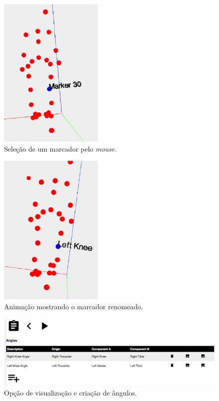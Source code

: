 \begin{figure}[ht]
	\centering
	\includegraphics[width=5cm]{figuras/tela20.eps}
	\caption{Seleção de um marcador pelo \emph{mouse}.}
\label{tela20}
\end{figure}



\begin{figure}[ht]
	\centering
	\includegraphics[width=5cm]{figuras/tela22.eps}
	\caption{Animação mostrando o marcador renomeado.}
\label{tela22}

\end{figure}


\begin{figure}[ht]
	\centering
	\includegraphics[width=15cm]{figuras/tela23.eps}
	\caption{Opção de visualização e criação de ângulos.}
\label{tela23}
\end{figure}


